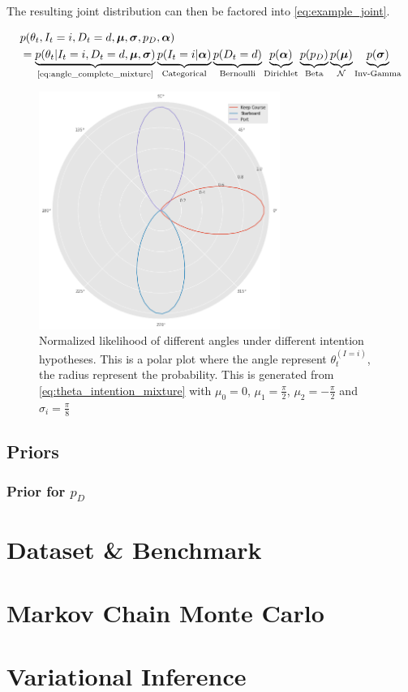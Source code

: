 The resulting joint distribution can then be factored into \cref{eq:example_joint}.

\begin{align}\label{eq:example_joint}
\begin{split}
    &p(\theta_t, I_t=i, D_t=d, \boldsymbol{\mu}, \boldsymbol{\sigma}, p_D, \boldsymbol{\alpha})\\
    &= \underbrace{p(\theta_t | I_t=i, D_t=d, \boldsymbol{\mu}, \boldsymbol{\sigma})}_{\text{\cref{eq:angle_complete_mixture}}}\underbrace{p(I_t=i | \boldsymbol{\alpha})}_{\text{Categorical}}\underbrace{p(D_t=d)}_{\text{Bernoulli}}\underbrace{p(\boldsymbol{\alpha})}_{\text{Dirichlet}}\underbrace{p(p_D)}_{\text{Beta}}\underbrace{p(\boldsymbol{\mu})}_{\mathcal{N}} \underbrace{p(\boldsymbol{\sigma})}_{\text{Inv-Gamma}}
\end{split}
\end{align}


\begin{figure}
    \centering
    \includegraphics[width=0.7\textwidth]{figures/intention_angle.png}
    \caption{Normalized likelihood of different angles under different intention hypotheses. This is a polar plot where the angle represent $\theta_t^{(I=i)}$, the radius represent the probability. This is generated from \cref{eq:theta_intention_mixture} with $\mu_0=0$, $\mu_1 = \frac{\pi}{2}$, $\mu_2=-\frac{\pi}{2}$ and $\sigma_i=\frac{\pi}{8}$}
    \label{fig:intention_angle}
\end{figure}

\subsection{Priors}
\subsubsection{Prior for $p_D$}


\section{Dataset \& Benchmark}
\section{Markov Chain Monte Carlo}
\section{Variational Inference}